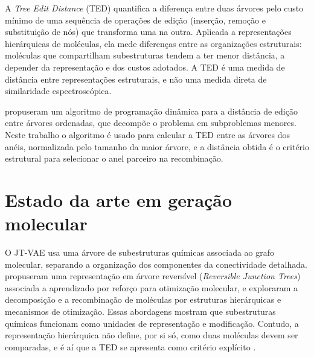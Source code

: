 A \textit{Tree Edit Distance} (TED) quantifica a diferença entre duas árvores pelo custo mínimo de uma sequência de operações de edição (inserção, remoção e substituição de nós) que transforma uma na outra. Aplicada a representações hierárquicas de moléculas, ela mede diferenças entre as organizações estruturais: moléculas que compartilham subestruturas tendem a ter menor distância, a depender da representação e dos custos adotados. A TED é uma medida de distância entre representações estruturais, e não uma medida direta de similaridade espectroscópica.

 propuseram um algoritmo de programação dinâmica para a distância de edição entre árvores ordenadas, que decompõe o problema em subproblemas menores. Neste trabalho o algoritmo é usado para calcular a TED entre as árvores dos anéis, normalizada pelo tamanho da maior árvore, e a distância obtida é o critério estrutural para selecionar o anel parceiro na recombinação.

\section{Estado da arte em geração molecular}
\label{sec:estado-da-arte}

O JT-VAE \cite{jin_2018} usa uma árvore de subestruturas químicas associada ao grafo molecular, separando a organização dos componentes da conectividade detalhada.  propuseram uma representação em árvore reversível (\textit{Reversible Junction Trees}) associada a aprendizado por reforço para otimização molecular, e  exploraram a decomposição e a recombinação de moléculas por estruturas hierárquicas e mecanismos de otimização. Essas abordagens mostram que subestruturas químicas funcionam como unidades de representação e modificação. Contudo, a representação hierárquica não define, por si só, como duas moléculas devem ser comparadas, e é aí que a TED se apresenta como critério explícito \cite{genheden_2021}.

